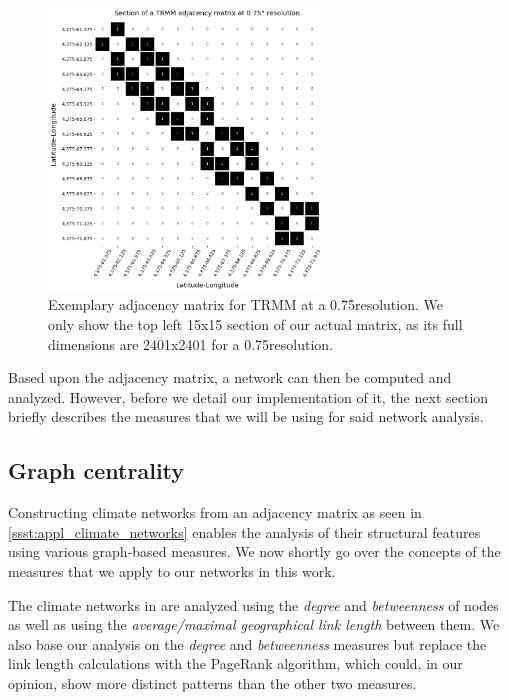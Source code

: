 \begin{figure}[h]
  \centering
  \includegraphics[width=0.65\textwidth]{./99_appendix/img/trmm_adjacency_example}
  \caption{Exemplary adjacency matrix for TRMM at a 0.75\degree resolution. We only show the top left 15x15 section of our actual matrix, as its full dimensions are 2401x2401 for a 0.75\degree resolution.}
  \label{fig:adjacency_matrix}
\end{figure}

Based upon the adjacency matrix, a network can then be computed and analyzed. However, before we detail our implementation of it, the next section briefly describes the measures that we will be using for said network analysis.

\subsection{Graph centrality}
\label{sst:network_measures}
Constructing climate networks from an adjacency matrix as seen in \cref{ssst:appl_climate_networks} enables the analysis of their structural features using various graph-based measures. We now shortly go over the concepts of the measures that we apply to our networks in this work.

The climate networks in \citet{Stolbova.2015} are analyzed using the \textit{degree} and \textit{betweenness} of nodes as well as using the \textit{average/maximal geographical link length} between them. We also base our analysis on the \textit{degree} and \textit{betweenness} measures but replace the link length calculations with the PageRank algorithm, which could, in our opinion, show more distinct patterns than the other two measures.


